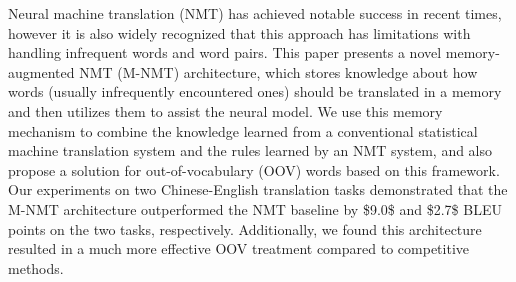 Neural machine translation (NMT) has achieved notable success in recent times, however it is also widely recognized that this approach has limitations with handling infrequent words and word pairs. This paper presents a novel memory-augmented NMT (M-NMT) architecture, which stores knowledge about how words (usually infrequently encountered ones) should be translated in a memory and then utilizes them to assist the neural model. We use this memory mechanism to combine the knowledge learned from a conventional statistical machine translation system and the rules learned by an NMT system, and also propose a solution for out-of-vocabulary (OOV) words based on this framework. Our experiments on two Chinese-English translation tasks demonstrated that the M-NMT architecture outperformed the NMT baseline by \$9.0\$ and \$2.7\$ BLEU points on the two tasks, respectively. Additionally, we found this architecture resulted in a much more effective OOV treatment compared to competitive methods.
